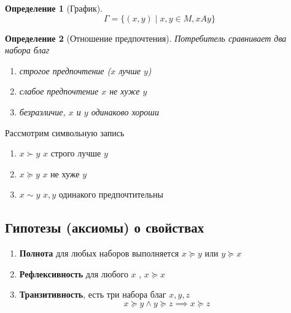 \documentclass[14pt]{extarticle}
\newtheorem{definition}{Определение}
\begin{document}
	\begin{definition}[График]
		\begin{equation} 
			\Gamma = \{(x,y) \mid x,y \in M, xAy\} 
		\end{equation} 
	\end{definition}
	\begin{definition}[Отношение предпочтения]
		Потребитель сравнивает два набора благ
		\begin{enumerate}
			\item строгое предпочтение ($x$ лучше  $y$)
			\item слабое предпочтение $x$ не хуже  $y$
			\item  безразличие,  $x$ и  $y$ одинаково хороши
		\end{enumerate}
	\end{definition}
	Рассмотрим символьную запись
	\begin{enumerate}
		\item $x \succ y$  $x$ строго лучше  $y$  
		\item $x \succeq y$ $x$ не хуже  $y$
		\item  $x \sim y$  $x,y$ одинакого предпочтительны
	\end{enumerate}
	\subsection{Гипотезы (аксиомы) о свойствах}
	\begin{enumerate}
		\item \textbf{ Полнота } для любых наборов выполняется $x \succeq y$ или $y \succeq x$
		\item \textbf{Рефлексивность} для любого $x$ ,  $x \succeq x$
		\item \textbf{Транзитивность},
			есть три набора благ
			$x,y,z$
			 \begin{equation} 
			x \succeq  y \land y \succeq z \implies x \succeq z
			\end{equation} 
	\end{enumerate}
\end{document}
